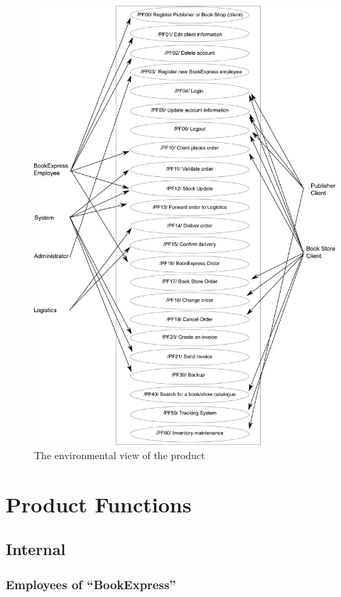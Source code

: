\documentclass[11pt,a4paper,oneside,svgnames]{report}
\begin{document}
\begin{figure}[h!]
 \begin{center}
  \includegraphics[width=\textwidth]{diagrams/BusinessProcessDiagram.png}
 \end{center}
 \caption{The environmental view of the product}
\end{figure}

\chapter{Product Functions}
\label{sec:product-functions}

\section{Internal}
\subsection{Employees of ``BookExpress''}
\end{document}
